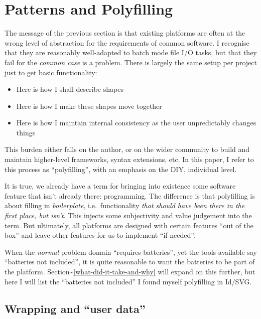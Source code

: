 \hypertarget{patterns-and-polyfilling}{%
\section{Patterns and Polyfilling}\label{patterns-and-polyfilling}}

The message of the previous section is that existing platforms are often
at the wrong level of abstraction for the requirements of common
software. I recognise that they are reasonably well-adapted to batch
mode file I/O tasks, but that they fail for the \emph{common case} is a
problem. There is largely the same setup per project just to get basic
functionality:

\begin{itemize}
\tightlist
\item
  Here is how I shall describe shapes
\item
  Here is how I make these shapes move together
\item
  Here is how I maintain internal consistency as the user unpredictably
  changes things
\end{itemize}

This burden either falls on the author, or on the wider community to
build and maintain higher-level frameworks, syntax extensions, etc. In
this paper, I refer to this process as ``polyfilling'', with an emphasis
on the DIY, individual level.

It is true, we already have a term for bringing into existence some
software feature that isn't already there: programming. The difference
is that polyfilling is about filling in \emph{boilerplate},
i.e.~functionality \emph{that should have been there in the first place,
but isn't}. This injects some subjectivity and value judgement into the
term. But ultimately, all platforms are designed with certain features
``out of the box'' and leave other features for us to implement ``if
needed''.

When the \emph{normal} problem domain ``requires batteries'', yet the
tools available say ``batteries not included'', it is quite reasonable
to want the batteries to be part of the platform.
Section\textasciitilde{}\ref{what-did-it-take-and-why} will expand on
this further, but here I will list the ``batteries not included'' I
found myself polyfilling in Id{}/SVG.

\hypertarget{wrapping-and-user-data}{%
\subsection{Wrapping and ``user data''}\label{wrapping-and-user-data}}

